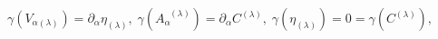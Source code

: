 \begin{equation}
\gamma \left( V_{\alpha (\lambda )}\right) =\partial _{\alpha }\eta
_{(\lambda )},\;\gamma \left( A_{\alpha }^{\;\;(\lambda )}\right) =\partial
_{\alpha }C^{(\lambda )},\;\gamma \left( \eta _{(\lambda )}\right) =0=\gamma
\left( C^{(\lambda )}\right) ,  \label{bf43}
\end{equation}

